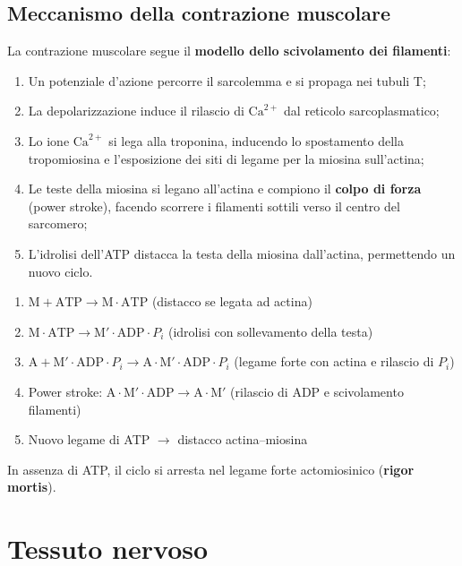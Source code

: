 \documentclass[11pt,a4paper,openright,twoside]{book}
\theoremstyle{definition}
\theoremstyle{plain}
\theoremstyle{remark}
\newcommand{\Ca}{\ensuremath{\text{Ca}^{2+}}}
\begin{document}
\subsection{Meccanismo della contrazione muscolare}

La contrazione muscolare segue il \textbf{modello dello scivolamento dei filamenti}:

\begin{enumerate}
  \item Un potenziale d'azione percorre il sarcolemma e si propaga nei tubuli T;
  \item La depolarizzazione induce il rilascio di \Ca{} dal reticolo sarcoplasmatico;
  \item Lo ione \Ca{} si lega alla troponina, inducendo lo spostamento della tropomiosina e l'esposizione dei siti di legame per la miosina sull'actina;
  \item Le teste della miosina si legano all'actina e compiono il \textbf{colpo di forza} (power stroke), facendo scorrere i filamenti sottili verso il centro del sarcomero;
  \item L'idrolisi dell'ATP distacca la testa della miosina dall'actina, permettendo un nuovo ciclo.
\end{enumerate}

\begin{tcolorbox}[defbox, title={Ciclo dei ponti actomiosinici}]
  \begin{enumerate}
    \item $\text{M} + \text{ATP} \to \text{M}\cdot\text{ATP}$ (distacco se legata ad actina)
    \item $\text{M}\cdot\text{ATP} \to \text{M}'\cdot\text{ADP}\cdot P_i$ (idrolisi con sollevamento della testa)
    \item $\text{A} + \text{M}'\cdot\text{ADP}\cdot P_i \to \text{A}\cdot\text{M}'\cdot\text{ADP}\cdot P_i$ (legame forte con actina e rilascio di $P_i$)
    \item Power stroke: $\text{A}\cdot\text{M}'\cdot\text{ADP} \to \text{A}\cdot\text{M}'$ (rilascio di ADP e scivolamento filamenti)
    \item Nuovo legame di ATP $\to$ distacco actina--miosina
  \end{enumerate}
  In assenza di ATP, il ciclo si arresta nel legame forte actomiosinico (\textbf{rigor mortis}).
\end{tcolorbox}

\section{Tessuto nervoso}
\end{document}
